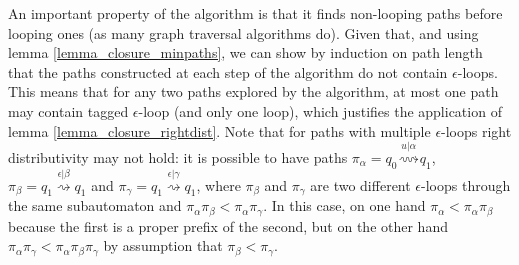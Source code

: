 \documentclass[AMA,STIX1COL]{WileyNJD-v2}
\begin{document}
An important property of the algorithm is that it finds non-looping paths before looping ones (as many graph traversal algorithms do).
Given that, and using lemma \ref{lemma_closure_minpaths},
we can show by induction on path length that the paths constructed at each step of the algorithm do not contain $\epsilon$-loops.
This means that for any two paths explored by the algorithm,
at most one path may contain tagged $\epsilon$-loop (and only one loop),
which justifies the application of lemma \ref{lemma_closure_rightdist}.
%
Note that for paths with multiple $\epsilon$-loops right distributivity may not hold:
it is possible to have paths
$\pi_\alpha = q_0 \overset {u | \alpha} {\rightsquigarrow} q_1$,
$\pi_\beta = q_1 \overset {\epsilon | \beta}  {\rightsquigarrow} q_1$ and
$\pi_\gamma = q_1 \overset {\epsilon | \gamma}  {\rightsquigarrow} q_1$,
where $\pi_\beta$ and $\pi_\gamma$ are two different $\epsilon$-loops through the same subautomaton
and $\pi_\alpha \pi_\beta < \pi_\alpha \pi_\gamma$.
In this case, on one hand $\pi_\alpha < \pi_\alpha \pi_\beta$ because the first is a proper prefix of the second,
but on the other hand $\pi_\alpha \pi_\gamma < \pi_\alpha \pi_\beta \pi_\gamma$ by assumption that $\pi_\beta < \pi_\gamma$.
\\
\end{document}
